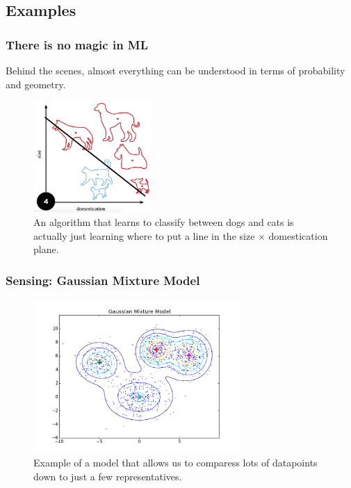 \documentclass[10pt,mathserif]{beamer}
\begin{document}
\subsection{Examples}
\label{subsec:label}

\begin{frame}
  \frametitle{There is no magic in ML}
  Behind the scenes, almost everything can be understood in terms of probability
  and geometry.
  \begin{figure}[ht]
    \centering
    \includegraphics[width=0.4\textwidth]{figures/perceptron}
    \caption{An algorithm that learns to classify between dogs and cats is
      actually just learning where to put a line in the size $\times$
      domestication plane. \label{fig:perceptron} }
  \end{figure}
\end{frame}

\begin{frame}
  \frametitle{Sensing: Gaussian Mixture Model}
 \begin{figure}[ht]
   \centering
   \includegraphics[width=0.7\textwidth]{figures/gmm}
   \caption{Example of a model that allows us to comparess lots of datapoints
     down to just a few representatives. \label{fig:gmm} }
 \end{figure}
\end{frame}
\end{document}
